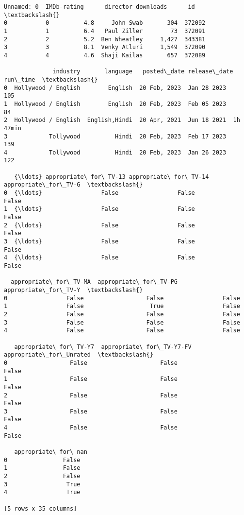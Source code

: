 \documentclass[11pt]{article}
\makeatletter
\newcommand{\boxspacing}{\kern\kvtcb@left@rule\kern\kvtcb@boxsep}
\newcommand{\prompt}[4]{
        {\ttfamily\llap{{\color{#2}[#3]:\hspace{3pt}#4}}\vspace{-\baselineskip}}
    }
\makeatother
\begin{document}
            \begin{tcolorbox}[breakable, size=fbox, boxrule=.5pt, pad at break*=1mm, opacityfill=0]
\prompt{Out}{outcolor}{91}{\boxspacing}
\begin{Verbatim}[commandchars=\\\{\}]
   Unnamed: 0  IMDb-rating      director downloads      id  \textbackslash{}
0           0          4.8     John Swab       304  372092
1           1          6.4   Paul Ziller        73  372091
2           2          5.2  Ben Wheatley     1,427  343381
3           3          8.1  Venky Atluri     1,549  372090
4           4          4.6  Shaji Kailas       657  372089

              industry       language   posted\_date release\_date  run\_time  \textbackslash{}
0  Hollywood / English        English  20 Feb, 2023  Jan 28 2023       105
1  Hollywood / English        English  20 Feb, 2023  Feb 05 2023        84
2  Hollywood / English  English,Hindi  20 Apr, 2021  Jun 18 2021  1h 47min
3            Tollywood          Hindi  20 Feb, 2023  Feb 17 2023       139
4            Tollywood          Hindi  20 Feb, 2023  Jan 26 2023       122

   {\ldots} appropriate\_for\_TV-13 appropriate\_for\_TV-14 appropriate\_for\_TV-G  \textbackslash{}
0  {\ldots}                 False                 False                False
1  {\ldots}                 False                 False                False
2  {\ldots}                 False                 False                False
3  {\ldots}                 False                 False                False
4  {\ldots}                 False                 False                False

  appropriate\_for\_TV-MA  appropriate\_for\_TV-PG  appropriate\_for\_TV-Y  \textbackslash{}
0                 False                  False                 False
1                 False                   True                 False
2                 False                  False                 False
3                 False                  False                 False
4                 False                  False                 False

   appropriate\_for\_TV-Y7  appropriate\_for\_TV-Y7-FV  appropriate\_for\_Unrated  \textbackslash{}
0                  False                     False                    False
1                  False                     False                    False
2                  False                     False                    False
3                  False                     False                    False
4                  False                     False                    False

   appropriate\_for\_nan
0                False
1                False
2                False
3                 True
4                 True

[5 rows x 35 columns]
\end{Verbatim}
\end{tcolorbox}
        
\end{document}
